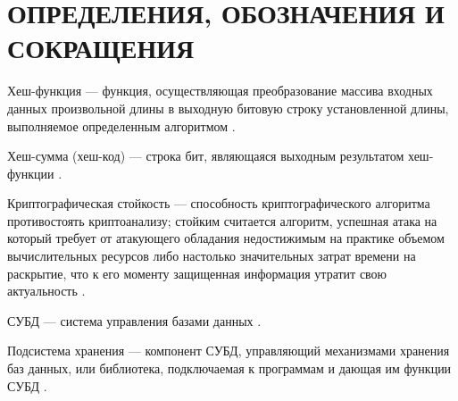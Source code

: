 \section*{ОПРЕДЕЛЕНИЯ, ОБОЗНАЧЕНИЯ И СОКРАЩЕНИЯ}

Хеш-функция --- функция, осуществляющая преобразование массива входных данных произвольной длины в выходную битовую строку установленной длины, выполняемое определенным алгоритмом \cite{hash}.

Хеш-сумма (хеш-код) --- строка бит, являющаяся выходным результатом хеш-функции \cite{hashsum}.

Криптографическая стойкость --- способность криптографического алгоритма противостоять криптоанализу; стойким считается алгоритм, успешная атака на который требует от атакующего обладания недостижимым на практике объемом вычислительных ресурсов либо настолько значительных затрат времени на раскрытие, что к его моменту защищенная информация утратит свою актуальность \cite{crypto}.

СУБД --- система управления базами данных \cite{dbms}.

Подсистема хранения ---  компонент СУБД, управляющий механизмами хранения баз данных, или библиотека, подключаемая к программам и дающая им функции СУБД \cite{dbengine}\cite{mysqlengines}.

\pagebreak